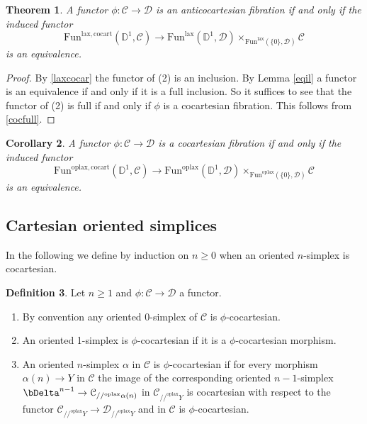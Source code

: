 \documentclass[10pt,oneside]{article}
\numberwithin{equation}{section} %
\numberwithin{figure}{section} %
\theoremstyle{plain}
\newtheorem{theorem}{Theorem}[subsection]
\newtheorem{corollary}[theorem]{Corollary}
\theoremstyle{definition}
\newtheorem{definition}[theorem]{Definition}
\newcommand{\bD}{{\mathbb D}}
\newcommand{\mC}{{\mathcal C}}
\newcommand{\mD}{{\mathcal D}}
\newcommand{\Fun}{\mathrm{Fun}}
\newcommand{\cocart}{{\mathrm{cocart}}}
\newcommand{\lax}{{\mathrm{lax}}}
\newcommand{\oplax}{{\mathrm{oplax}}}
\begin{document}
\begin{theorem}\label{precocart}
A functor $\phi: \mC \to \mD$ is an anticocartesian fibration if and only if 
the induced functor $$\Fun^{\lax, \cocart}(\bD^1,\mC) \to \Fun^\lax(\bD^1,\mD) \times_{\Fun^\lax(\{0\},\mD)} \mC $$ 
is an equivalence.
    
\end{theorem}

\begin{proof}
By \cref{laxcocar} the functor of (2) is an inclusion.
By Lemma \cref{eqil} a functor is an equivalence if and only if it is a full inclusion.
So it suffices to see that the functor of (2) is full if and only if $\phi$ is a cocartesian fibration.
This follows from \cref{cocfull}.
\end{proof}

\begin{corollary}\label{precocart2}
A functor $\phi: \mC \to \mD$ is a cocartesian fibration if and only if the induced functor $$\Fun^{\oplax, \cocart}(\bD^1,\mC) \to \Fun^\oplax(\bD^1,\mD) \times_{\Fun^\oplax(\{0\},\mD)} \mC $$ 
is an equivalence.

\end{corollary}


\subsection{Cartesian oriented simplices}

In the following we define by induction on $n \geq 0$ when an oriented $n$-simplex is cocartesian.

\begin{definition}Let $n \geq 1$ and $\phi: \mC \to \mD$ a functor.

\begin{enumerate}[\normalfont(1)]\setlength{\itemsep}{-2pt}
\item By convention any oriented 0-simplex of $\mC$ is $\phi$-cocartesian.

\item An oriented 1-simplex is $\phi$-cocartesian if it is a 
$\phi$-cocartesian morphism.

\item An oriented $n$-simplex $\alpha$ in $\mC$ is $\phi$-cocartesian if for every morphism $\alpha(n) \to Y$ in $\mC$ the image of the corresponding oriented $n-1$-simplex $\bDelta^{n-1}\to \mC_{//^\oplax \alpha(n)} $ 
in $ \mC_{//^\oplax Y}$ is cocartesian with respect to the functor
$ \mC_{//^\oplax Y} \to \mD_{//^\oplax Y}$
and in $ \mC$ is $\phi$-cocartesian.
\end{enumerate}

\end{definition}
\end{document}
